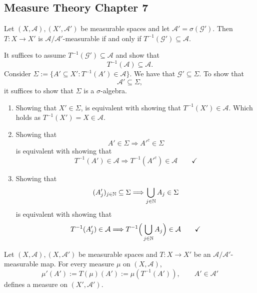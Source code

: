 \subsection{Measure Theory Chapter 7}

\begin{prop}
Let \((X,\mathcal{A}),(X',\mathcal{A}')\) be measurable spaces and let \(\mathcal{A}'=\sigma (\mathcal{G}').\) Then \(T:X\rightarrow X'\) is \(\mathcal{A}/\mathcal{A}'\)-measurable if and only if \(T^{-1}(\mathcal{G}')\subseteq \mathcal{A}.\)
\end{prop}

It suffices to assume \(T^{-1}(\mathcal{G}')\subseteq \mathcal{A}\) and show that
\[
T^{-1}(\mathcal{A})\subseteq \mathcal{A}.
\]
Consider \(\Sigma :=\{A'\subseteq X' : T^{-1}(A')\in \mathcal{A}\}\). We have that \(\mathcal{G}'\subseteq \Sigma \). To show that
\[
\mathcal{A}'\subseteq \Sigma ,
\]
it suffices to show that \(\Sigma \) is a \(\sigma \)-algebra.

\begin{enumerate}
  \item Showing that \(X'\in \Sigma \), is equivalent with showing that \(T^{-1}(X')\in \mathcal{A}\). Which holds as $T^{-1}(X')=X\in \mathcal{A}$.
  \item Showing that
\[
A'\in \Sigma  \Longrightarrow  A'^c\in \Sigma 
\]
is equivalent with showing that
\[
T^{-1}(A')\in \mathcal{A} \Longrightarrow  T^{-1}(A'^c)\in \mathcal{A} \qquad\checkmark
\]
  \item Showing that
\[
(A_{j}')_{j\in \Bbb{N}}\subseteq \Sigma  \Longrightarrow  \bigcup _{j\in \Bbb{N}}A_{j}\in \Sigma 
\]
is equivalent with showing that
\[
T^{-1}(A_{j}')\in \mathcal{A}\Longrightarrow T^{-1}\Big(\bigcup _{j\in \Bbb{N}}A_{j}\Big)\in \mathcal{A} \qquad\checkmark
\]
\end{enumerate}

\begin{prop}
Let \((X,\mathcal{A}),(X,\mathcal{A}')\) be measurable spaces and \(T:X\rightarrow X'\) be an \(\mathcal{A}/\mathcal{A}'\)-measurable map. For every measure \(\mu \) on \((X,\mathcal{A})\),
\[
\mu '(A'):=T(\mu )(A'):=\mu (T^{-1}(A')), \qquad A'\in \mathcal{A}'
\]
defines a measure on \((X',\mathcal{A}').\)
\end{prop}

